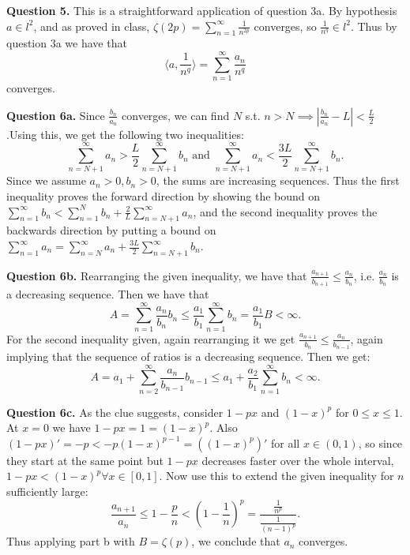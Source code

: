 \documentclass[letterpaper, reqno,11pt]{article}
\begin{document}
\newpage\phantom{blabla}
\newpage

{\medskip\noindent\bf Question 5.} This is a straightforward application of question 3a. By hypothesis $a\in l^2$, and as proved in class, $\zeta(2p)=\sum_{n=1}^{\infty}\frac{1}{n^{2p}}$ converges, so $\frac{1}{n^{q}}\in l^2$. Thus by question 3a we have that
\[
\langle a,\frac{1}{n^{q}}\rangle =\sum_{n=1}^{\infty}\frac{a_n}{n^{q}}
\]
converges.

\newpage\phantom{blabla}
\newpage

{\medskip\noindent\bf Question 6a.} Since $\frac{b_n}{a_n}$ converges, we can find $N$ s.t. $n>N\implies|\frac{b_n}{a_n}-L|<\frac{L}{2}$.Using this, we get the following two inequalities:
\[
\sum_{n=N+1}^{\infty}a_{n}>\frac{L}{2}\sum_{n=N+1}^{\infty}b_n\text{ and }\sum_{n=N+1}^{\infty}a_n< \frac{3L}{2}\sum_{n=N+1}^{\infty}b_n
.\]
Since we assume $a_n>0,b_n>0$, the sums are increasing sequences. Thus the first inequality proves the forward direction by showing the bound on $\sum_{n=1}^{\infty}b_n<\sum_{n=1}^{N}b_n+\frac{2}{L}\sum_{n=N+1}^{\infty}a_n$, and the second inequality proves the backwards direction by putting a bound on $\sum_{n=1}^{\infty}a_n=\sum_{n=N}^{\infty}a_n+\frac{3L}{2}\sum_{n=N+1}^{\infty}b_n$.

{\medskip\noindent\bf Question 6b.} Rearranging the given inequality, we have that $\frac{a_{n+1}}{b_{n+1}}\leq \frac{a_{n}}{b_n}$, i.e. $\frac{a_n}{b_n}$ is a decreasing sequence. Then we have that
\[
A=\sum_{n=1}^{\infty}\frac{a_n}{b_n}b_n\leq \frac{a_1}{b_1}\sum_{n=1}^{\infty}b_n=\frac{a_1}{b_1}B<\infty
.\]
For the second inequality given, again rearranging it we get $\frac{a_{n+1}}{b_n}\leq \frac{a_n}{b_{n-1}}$, again implying that the sequence of ratios is a decreasing sequence. Then we get:
\[
A=a_1+\sum_{n=2}^{\infty}\frac{a_{n}}{b_{n-1}}b_{n-1}\leq a_1 +\frac{a_2}{b_1}\sum_{n=1}^{\infty}b_{n}<\infty
.\]

{\medskip\noindent\bf Question 6c.} As the clue suggests, consider $1-px$ and $(1-x)^{p}$ for $0\leq x\leq 1$. At $x=0$ we have $1-px=1=(1-x)^{p}$. Also $(1-px)'=-p<-p(1-x)^{p-1}=\left((1-x)^{p}\right)'$ for all $x\in(0,1)$, so since they start at the same point but $1-px$ decreases faster over the whole interval, $1-px<(1-x)^{p}\forall x\in[0,1]$. Now use this to extend the given inequality for $n$ sufficiently large:
\[
\frac{a_{n+1}}{a_n}\leq 1-\frac{p}{n}<\left(1-\frac{1}{n}\right)^{p}=\frac{\frac{1}{n^{p}}}{\frac{1}{(n-1)^{p}}}
.\]
Thus applying part b with $B=\zeta(p)$, we conclude that $a_n$ converges.
\end{document}
